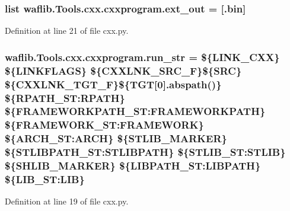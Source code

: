 \subsubsection[{\texorpdfstring{ext\+\_\+out}{ext_out}}]{\setlength{\rightskip}{0pt plus 5cm}list waflib.\+Tools.\+cxx.\+cxxprogram.\+ext\+\_\+out = \mbox{[}\textquotesingle{}.bin\textquotesingle{}\mbox{]}\hspace{0.3cm}{\ttfamily [static]}}\hypertarget{classwaflib_1_1_tools_1_1cxx_1_1cxxprogram_a389ec82e90a9be0be75b449b32f733ce}{}\label{classwaflib_1_1_tools_1_1cxx_1_1cxxprogram_a389ec82e90a9be0be75b449b32f733ce}


Definition at line 21 of file cxx.\+py.

\subsubsection[{\texorpdfstring{run\+\_\+str}{run_str}}]{ waflib.\+Tools.\+cxx.\+cxxprogram.\+run\+\_\+str = \textquotesingle{}\$\{L\+I\+N\+K\+\_\+\+C\+XX\} \$\{L\+I\+N\+K\+F\+L\+A\+GS\} \$\{C\+X\+X\+L\+N\+K\+\_\+\+S\+R\+C\+\_\+F\}\$\{S\+RC\} \$\{C\+X\+X\+L\+N\+K\+\_\+\+T\+G\+T\+\_\+F\}\$\{T\+GT\mbox{[}0\mbox{]}.abspath()\} \$\{R\+P\+A\+T\+H\+\_\+\+S\+T\+:\+R\+P\+A\+TH\} \$\{F\+R\+A\+M\+E\+W\+O\+R\+K\+P\+A\+T\+H\+\_\+\+S\+T\+:\+F\+R\+A\+M\+E\+W\+O\+R\+K\+P\+A\+TH\} \$\{F\+R\+A\+M\+E\+W\+O\+R\+K\+\_\+\+S\+T\+:\+F\+R\+A\+M\+E\+W\+O\+RK\} \$\{A\+R\+C\+H\+\_\+\+S\+T\+:\+A\+R\+CH\} \$\{S\+T\+L\+I\+B\+\_\+\+M\+A\+R\+K\+ER\} \$\{S\+T\+L\+I\+B\+P\+A\+T\+H\+\_\+\+S\+T\+:\+S\+T\+L\+I\+B\+P\+A\+TH\} \$\{S\+T\+L\+I\+B\+\_\+\+S\+T\+:\+S\+T\+L\+IB\} \$\{S\+H\+L\+I\+B\+\_\+\+M\+A\+R\+K\+ER\} \$\{L\+I\+B\+P\+A\+T\+H\+\_\+\+S\+T\+:\+L\+I\+B\+P\+A\+TH\} \$\{L\+I\+B\+\_\+\+S\+T\+:\+L\+IB\}\textquotesingle{}\hspace{0.3cm}{\ttfamily [static]}}\hypertarget{classwaflib_1_1_tools_1_1cxx_1_1cxxprogram_a8a9585243550a2606c05e99ae5187c41}{}\label{classwaflib_1_1_tools_1_1cxx_1_1cxxprogram_a8a9585243550a2606c05e99ae5187c41}


Definition at line 19 of file cxx.\+py.

